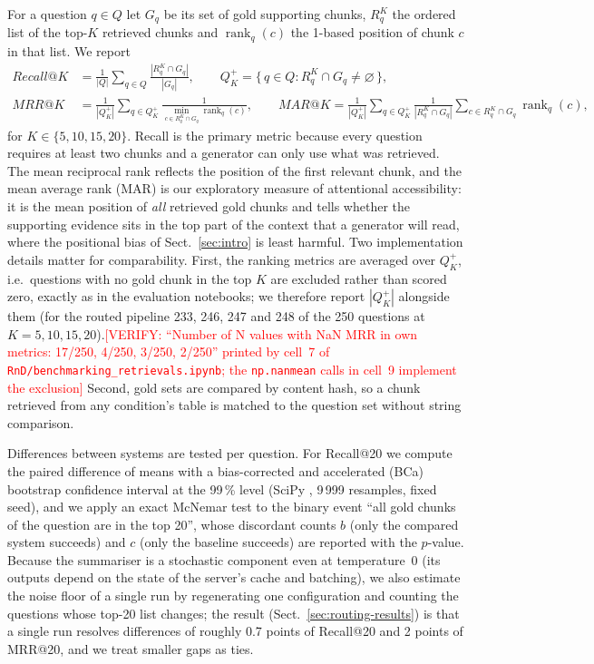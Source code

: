 \documentclass[pdflatex,sn-mathphys-num]{sn-jnl}
\makeatletter
\newcommand{\todo}[1]{\textcolor{red}{#1}}
\newcommand{\verify}[1]{\todo{[VERIFY: #1]}}
\newcommand{\Rec}[1]{Recall@#1}
\newcommand{\MRR}[1]{MRR@#1}
\newcommand{\MAR}[1]{MAR@#1}
\newcommand{\rnk}{\operatorname{rank}}
\theoremstyle{thmstyleone}%
\theoremstyle{thmstylethree}%
\makeatother
\begin{document}
For a question $q\in Q$ let $G_q$ be its set of gold supporting chunks, $R_q^K$ the ordered list of the top-$K$ retrieved chunks and $\rnk_q(c)$ the 1-based position of chunk $c$ in that list. We report
\begin{align}
\Rec{K}&=\frac{1}{|Q|}\sum_{q\in Q}\frac{|R_q^K\cap G_q|}{|G_q|},\qquad
Q_K^{+}=\{\,q\in Q : R_q^K\cap G_q\neq\varnothing\,\},\label{eq:recall}\\
\MRR{K}&=\frac{1}{|Q_K^{+}|}\sum_{q\in Q_K^{+}}\frac{1}{\min_{c\in R_q^K\cap G_q}\rnk_q(c)},\qquad
\MAR{K}=\frac{1}{|Q_K^{+}|}\sum_{q\in Q_K^{+}}\frac{1}{|R_q^K\cap G_q|}\sum_{c\in R_q^K\cap G_q}\rnk_q(c),\label{eq:mrr}
\end{align}
for $K\in\{5,10,15,20\}$. Recall is the primary metric because every question requires at least two chunks and a generator can only use what was retrieved. The mean reciprocal rank \cite{voorhees1999trec8} reflects the position of the first relevant chunk, and the mean average rank (MAR) is our exploratory measure of attentional accessibility: it is the mean position of \emph{all} retrieved gold chunks and tells whether the supporting evidence sits in the top part of the context that a generator will read, where the positional bias of Sect.~\ref{sec:intro} is least harmful. Two implementation details matter for comparability. First, the ranking metrics are averaged over $Q_K^{+}$, i.e.\ questions with no gold chunk in the top $K$ are excluded rather than scored zero, exactly as in the evaluation notebooks; we therefore report $|Q_K^{+}|$ alongside them (for the routed pipeline 233, 246, 247 and 248 of the 250 questions at $K=5,10,15,20$).\verify{``Number of N values with NaN MRR in own metrics: 17/250, 4/250, 3/250, 2/250'' printed by cell~7 of \texttt{RnD/benchmarking\_retrievals.ipynb}; the \texttt{np.nanmean} calls in cell~9 implement the exclusion} Second, gold sets are compared by content hash, so a chunk retrieved from any condition's table is matched to the question set without string comparison.

Differences between systems are tested per question. For \Rec{20} we compute the paired difference of means with a bias-corrected and accelerated (BCa) bootstrap confidence interval at the 99\,\% level \cite{efron1987better,smucker2007comparison} (SciPy \cite{virtanen2020scipy}, 9\,999 resamples, fixed seed), and we apply an exact McNemar test \cite{McNemar_1947,dietterich1998approximate} to the binary event ``all gold chunks of the question are in the top 20'', whose discordant counts $b$ (only the compared system succeeds) and $c$ (only the baseline succeeds) are reported with the $p$-value. Because the summariser is a stochastic component even at temperature~0 (its outputs depend on the state of the server's cache and batching), we also estimate the noise floor of a single run by regenerating one configuration and counting the questions whose top-20 list changes; the result (Sect.~\ref{sec:routing-results}) is that a single run resolves differences of roughly 0.7 points of \Rec{20} and 2 points of \MRR{20}, and we treat smaller gaps as ties.
\end{document}
